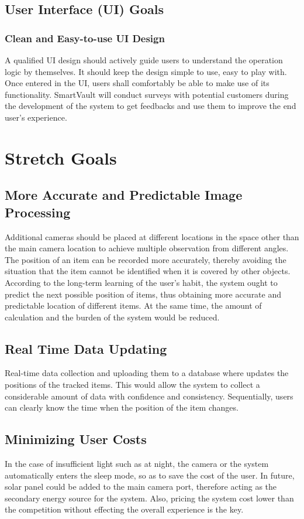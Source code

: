\documentclass{article}
\begin{document}
\subsection{User Interface (UI) Goals}
\subsubsection{Clean and Easy-to-use UI Design}
A qualified UI design should actively guide users to understand the operation logic by themselves. It should keep the design simple to use, easy to play with. Once entered in the UI, users shall comfortably be able to make use of its functionality. SmartVault will conduct surveys with potential customers during the development of the system to get feedbacks and use them to improve the end user’s experience.
\section{Stretch Goals}
\subsection{More Accurate and Predictable Image Processing}
Additional cameras should be placed at different locations in the space other than the main camera location to achieve multiple observation from different angles. The position of an item can be recorded more accurately, thereby avoiding the situation that the item cannot be identified when it is covered by other objects. According to the long-term learning of the user’s habit, the system ought to predict the next possible position of items, thus obtaining more accurate and predictable location of different items. At the same time, the amount of calculation and the burden of the system would be reduced.
\subsection{Real Time Data Updating}
Real-time data collection and uploading them to a database where updates the positions of the tracked items. This would allow the system to collect a considerable amount of data with confidence and consistency. Sequentially, users can clearly know the time when the position of the item changes.
\subsection{Minimizing User Costs}
In the case of insufficient light such as at night, the camera or the system automatically enters the sleep mode, so as to save the cost of the user. In future, solar panel could be added to the main camera port, therefore acting as the secondary energy source for the system. Also, pricing the system cost lower than the competition without effecting the overall experience is the key.
\end{document}
